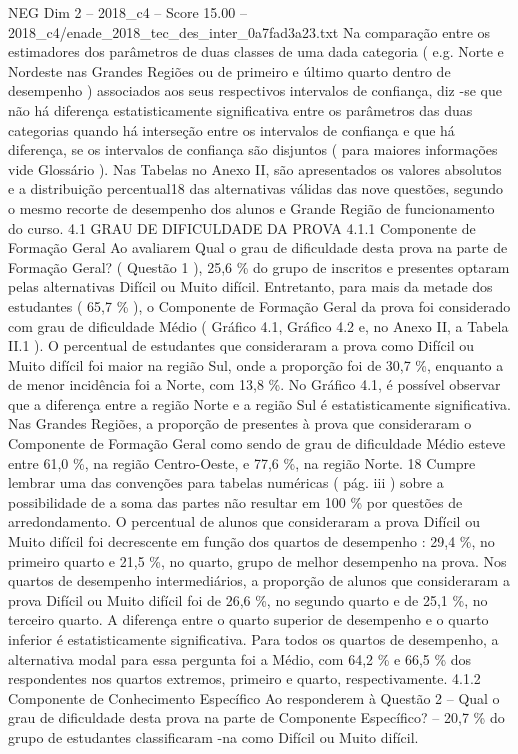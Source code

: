 \begin{textsample}{NEG Dim 2 – 2018\_c4 – Score 15.00 – 2018\_c4/enade\_2018\_tec\_des\_inter\_0a7fad3a23.txt}
Na comparação entre os estimadores dos parâmetros de duas classes de uma dada categoria ( e.g.
Norte e Nordeste nas Grandes Regiões ou de primeiro e último quarto dentro de desempenho ) associados aos seus respectivos intervalos de confiança, diz -se que não há diferença estatisticamente significativa entre os parâmetros das duas categorias quando há interseção entre os intervalos de confiança e que há diferença, se os intervalos de confiança são disjuntos ( para maiores informações vide Glossário ).
Nas Tabelas no Anexo II, são apresentados os valores absolutos e a distribuição percentual18 das alternativas válidas das nove questões, segundo o mesmo recorte de desempenho dos alunos e Grande Região de funcionamento do curso. 4.1 GRAU DE DIFICULDADE DA PROVA 4.1.1 Componente de Formação Geral Ao avaliarem Qual o grau de dificuldade desta prova na parte de Formação Geral? ( Questão 1 ), 25,6 \% do grupo de inscritos e presentes optaram pelas alternativas Difícil ou Muito difícil.
Entretanto, para mais da metade dos estudantes ( 65,7 \% ), o Componente de Formação Geral da prova foi considerado com grau de dificuldade Médio ( Gráfico 4.1, Gráfico 4.2 e, no Anexo II, a Tabela II.1 ).
O percentual de estudantes que consideraram a prova como Difícil ou Muito difícil foi maior na região Sul, onde a proporção foi de 30,7 \%, enquanto a de menor incidência foi a Norte, com 13,8 \%.
No Gráfico 4.1, é possível observar que a diferença entre a região Norte e a região Sul é estatisticamente significativa.
Nas Grandes Regiões, a proporção de presentes à prova que consideraram o Componente de Formação Geral como sendo de grau de dificuldade Médio esteve entre 61,0 \%, na região Centro-Oeste, e 77,6 \%, na região Norte. 18 Cumpre lembrar uma das convenções para tabelas numéricas ( pág. iii ) sobre a possibilidade de a soma das partes não resultar em 100 \% por questões de arredondamento.
O percentual de alunos que consideraram a prova Difícil ou Muito difícil foi decrescente em função dos quartos de desempenho : 29,4 \%, no primeiro quarto e 21,5 \%, no quarto, grupo de melhor desempenho na prova.
Nos quartos de desempenho intermediários, a proporção de alunos que consideraram a prova Difícil ou Muito difícil foi de 26,6 \%, no segundo quarto e de 25,1 \%, no terceiro quarto.
A diferença entre o quarto superior de desempenho e o quarto inferior é estatisticamente significativa.
Para todos os quartos de desempenho, a alternativa modal para essa pergunta foi a Médio, com 64,2 \% e 66,5 \% dos respondentes nos quartos extremos, primeiro e quarto, respectivamente. 4.1.2 Componente de Conhecimento Específico Ao responderem à Questão 2 – Qual o grau de dificuldade desta prova na parte de Componente Específico? – 20,7 \% do grupo de estudantes classificaram -na como Difícil ou Muito difícil.

\end{textsample}
